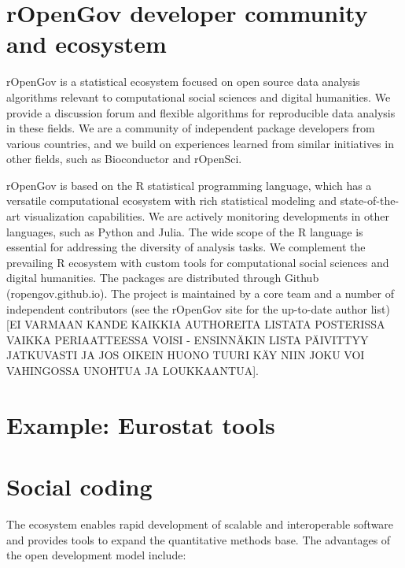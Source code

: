 \documentclass{article}\usepackage[]{graphicx}\usepackage[]{color}
\begin{document}
\section{rOpenGov developer community and ecosystem}

rOpenGov is a statistical ecosystem focused on open source data
analysis algorithms relevant to computational social sciences and
digital humanities. We provide a discussion forum and flexible
algorithms for reproducible data analysis in these fields. We are a
community of independent package developers from various countries,
and we build on experiences learned from similar initiatives in other
fields, such as Bioconductor and rOpenSci.

rOpenGov is based on the R statistical programming language, which has
a versatile computational ecosystem with rich statistical modeling and
state-of-the-art visualization capabilities. We are actively
monitoring developments in other languages, such as Python and
Julia. The wide scope of the R language is essential for addressing
the diversity of analysis tasks. We complement the prevailing R
ecosystem with custom tools for computational social sciences and
digital humanities. The packages are distributed through Github
(ropengov.github.io). The project is maintained by a core team and a
number of independent contributors (see the rOpenGov site for the
up-to-date author list) [EI VARMAAN KANDE KAIKKIA AUTHOREITA LISTATA
POSTERISSA VAIKKA PERIAATTEESSA VOISI - ENSINNÄKIN LISTA PÄIVITTYY
JATKUVASTI JA JOS OIKEIN HUONO TUURI KÄY NIIN JOKU VOI VAHINGOSSA
UNOHTUA JA LOUKKAANTUA].


\section{Example: Eurostat tools}




\section{Social coding}

The ecosystem enables rapid development of scalable and interoperable
software and provides tools to expand the quantitative methods
base. The advantages of the open development model include:
\end{document}
